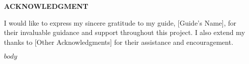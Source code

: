 \documentclass[12pt,a4paper,oneside]{report}
\begin{document}
\newpage
\thispagestyle{empty}
\vspace*{2cm}
\begin{center}
    \textbf{ACKNOWLEDGMENT}
\end{center}
\vspace{1cm}
I would like to express my sincere gratitude to my guide, [Guide's Name], for their invaluable guidance and support throughout this project. I also extend my thanks to [Other Acknowledgments] for their assistance and encouragement.

\newpage
\tableofcontents

$body$
\end{document}
